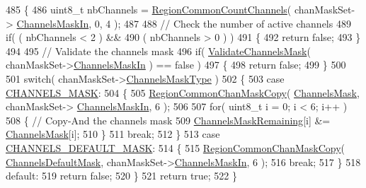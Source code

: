 \begin{DoxyCode}
485 \{
486     uint8\_t nbChannels = \mbox{\hyperlink{group___r_e_g_i_o_n_c_o_m_m_o_n_gac23f0831812f610f57f42f6cf87368c9}{RegionCommonCountChannels}}( chanMaskSet->
      \mbox{\hyperlink{structs_chan_mask_set_params_ade387d6ecaf27781b14ad97ebdfc0695}{ChannelsMaskIn}}, 0, 4 );
487 
488     \textcolor{comment}{// Check the number of active channels}
489     \textcolor{keywordflow}{if}( ( nbChannels < 2 ) &&
490         ( nbChannels > 0 ) )
491     \{
492         \textcolor{keywordflow}{return} \textcolor{keyword}{false};
493     \}
494 
495     \textcolor{comment}{// Validate the channels mask}
496     \textcolor{keywordflow}{if}( \mbox{\hyperlink{_region_u_s915-_hybrid_8c_a15a15fb81475f8a2ff4c6c5a60aa291d}{ValidateChannelsMask}}( chanMaskSet->\mbox{\hyperlink{structs_chan_mask_set_params_ade387d6ecaf27781b14ad97ebdfc0695}{ChannelsMaskIn}} ) == \textcolor{keyword}{false}  )
497     \{
498         \textcolor{keywordflow}{return} \textcolor{keyword}{false};
499     \}
500 
501     \textcolor{keywordflow}{switch}( chanMaskSet->\mbox{\hyperlink{structs_chan_mask_set_params_a02b75be74cbc34fa2126b2c250ea9283}{ChannelsMaskType}} )
502     \{
503         \textcolor{keywordflow}{case} \mbox{\hyperlink{group___r_e_g_i_o_n_gga7a62e669f567fc160ad58210664bca9ca1e68275c0b16a0c4935eada4315dd089}{CHANNELS\_MASK}}:
504         \{
505             \mbox{\hyperlink{group___r_e_g_i_o_n_c_o_m_m_o_n_ga95f5199d490113269fae7f2e0569e9a0}{RegionCommonChanMaskCopy}}( \mbox{\hyperlink{_region_u_s915-_hybrid_8c_a2188957b5ca6af8092154d7ccbfa5757}{ChannelsMask}}, chanMaskSet->
      \mbox{\hyperlink{structs_chan_mask_set_params_ade387d6ecaf27781b14ad97ebdfc0695}{ChannelsMaskIn}}, 6 );
506 
507             \textcolor{keywordflow}{for}( uint8\_t i = 0; i < 6; i++ )
508             \{ \textcolor{comment}{// Copy-And the channels mask}
509                 \mbox{\hyperlink{_region_u_s915-_hybrid_8c_a567333cec639a004655cc1717e9d0928}{ChannelsMaskRemaining}}[i] &= \mbox{\hyperlink{_region_u_s915-_hybrid_8c_a2188957b5ca6af8092154d7ccbfa5757}{ChannelsMask}}[i];
510             \}
511             \textcolor{keywordflow}{break};
512         \}
513         \textcolor{keywordflow}{case} \mbox{\hyperlink{group___r_e_g_i_o_n_gga7a62e669f567fc160ad58210664bca9ca9bbb18c8600ad8781ba04a2cb121ea60}{CHANNELS\_DEFAULT\_MASK}}:
514         \{
515             \mbox{\hyperlink{group___r_e_g_i_o_n_c_o_m_m_o_n_ga95f5199d490113269fae7f2e0569e9a0}{RegionCommonChanMaskCopy}}( 
      \mbox{\hyperlink{_region_u_s915-_hybrid_8c_ac127b19779301713d5ed92eb03366a2d}{ChannelsDefaultMask}}, chanMaskSet->\mbox{\hyperlink{structs_chan_mask_set_params_ade387d6ecaf27781b14ad97ebdfc0695}{ChannelsMaskIn}}, 6 );
516             \textcolor{keywordflow}{break};
517         \}
518         \textcolor{keywordflow}{default}:
519             \textcolor{keywordflow}{return} \textcolor{keyword}{false};
520     \}
521     \textcolor{keywordflow}{return} \textcolor{keyword}{true};
522 \}
\end{DoxyCode}
